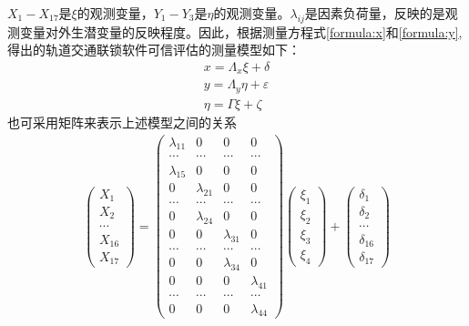 $X_1-X_{17}$是$\xi$的观测变量，$Y_1-Y_3$是$\eta$的观测变量。$\lambda_{ij}$是因素负荷量，反映的是观测变量对外生潜变量的反映程度。因此，根据测量方程式\ref{formula:x}和\ref{formula:y},得出的轨道交通联锁软件可信评估的测量模型如下：
\begin{align}
    x=\Lambda_x\xi+\delta \\
    y=\Lambda_y\eta+\varepsilon\\
    \eta=\Gamma\xi+\zeta 
\end{align}
也可采用矩阵来表示上述模型之间的关系
\begin{gather}
\begin{pmatrix}
X_1\\
X_2\\
\cdots \\
X_{16}\\
X_{17}
\end{pmatrix}=
\begin{pmatrix}
\lambda_{11} & 0 & 0 & 0 \\
\cdots & \cdots & \cdots & \cdots \\
\lambda_{15} & 0 & 0 & 0 \\
0 & \lambda_{21} & 0 & 0 \\
\cdots & \cdots & \cdots & \cdots \\
0 & \lambda_{24} & 0 & 0 \\
0 & 0 & \lambda_{31} & 0 \\
\cdots & \cdots & \cdots & \cdots \\
0 & 0 & \lambda_{34} & 0 \\
0 & 0 & 0 & \lambda_{41} \\
\cdots & \cdots & \cdots & \cdots \\
0 & 0 & 0 & \lambda_{44} 
\end{pmatrix}
\begin{pmatrix}
\xi_1\\
\xi_2\\
\xi_3 \\
\xi_4
\end{pmatrix}
+
\begin{pmatrix}
\delta_1\\
\delta_2\\
\cdots \\
\delta_{16}\\
\delta_{17}
\end{pmatrix}
\end{gather}


